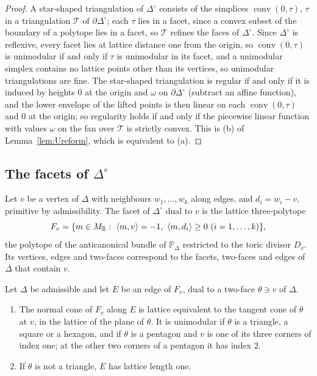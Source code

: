 \begin{proof}
A star-shaped triangulation of $\Delta^\circ$ consists of the simplices $\operatorname{conv}(0,\tau)$, $\tau$ in a
triangulation $\mathcal T$ of $\partial\Delta^\circ$; each $\tau$ lies in a facet, since a convex subset of the boundary of a
polytope lies in a facet, so $\mathcal T$ refines the faces of $\Delta^\circ$. Since $\Delta^\circ$ is reflexive, every facet lies at lattice distance
one from the origin, so $\operatorname{conv}(0,\tau)$ is unimodular if and only if $\tau$ is unimodular in its facet, and a
unimodular simplex contains no lattice points other than its vertices, so unimodular triangulations are fine. The
star-shaped triangulation is regular if and only if it is induced by heights $0$ at the origin and $\omega$ on
$\partial\Delta^\circ$ (subtract an affine function), and the lower envelope of the lifted points is then linear on each
$\operatorname{conv}(0,\tau)$ and $0$ at the origin; so regularity holds if and only if the piecewise linear function with
values $\omega$ on the fan over $\mathcal T$ is strictly convex. This is (b) of Lemma~\ref{lem:Ureform}, which is equivalent to (a).
\end{proof}

\subsection{The facets of \texorpdfstring{$\Delta^\circ$}{the polar polytope}}\label{ssec:ufacets}
Let $v$ be a vertex of $\Delta$ with neighbours $w_1,\dots,w_k$ along edges, and $d_i=w_i-v$, primitive by admissibility.
The facet of $\Delta^\circ$ dual to $v$ is the lattice three-polytope
\[
F_v=\{m\in M_\R:\ \langle m,v\rangle=-1,\ \langle m,d_i\rangle\ge0\ (i=1,\dots,k)\},
\]
the polytope of the anticanonical bundle of $\mathbb P_\Delta$ restricted to the toric divisor $D_v$. Its vertices, edges
and two-faces correspond to the facets, two-faces and edges of $\Delta$ that contain $v$.

\begin{proposition}\label{prop:Ufacets}
Let $\Delta$ be admissible and let $E$ be an edge of $F_v$, dual to a two-face $\theta\ni v$ of $\Delta$.
\begin{enumerate}
\item The normal cone of $F_v$ along $E$ is lattice equivalent to the tangent cone of $\theta$ at $v$, in the lattice of the
plane of $\theta$. It is unimodular if $\theta$ is a triangle, a square or a hexagon, and if $\theta$ is a pentagon and $v$
is one of its three corners of index one; at the other two corners of a pentagon it has index $2$.
\item If $\theta$ is not a triangle, $E$ has lattice length one.
\end{enumerate}
\end{proposition}

